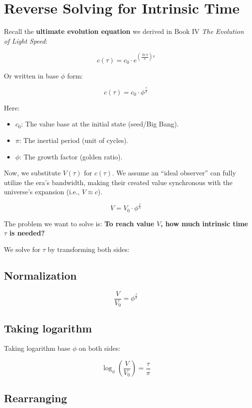 \section{Reverse Solving for Intrinsic Time}

Recall the \textbf{ultimate evolution equation} we derived in Book IV \textit{The Evolution of Light Speed}:

\[c(\tau) = c_0 \cdot e^{\left( \frac{\ln \phi}{\pi} \right) \tau}\]

Or written in base $\phi$ form:

\[c(\tau) = c_0 \cdot \phi^{\frac{\tau}{\pi}}\]

Here:

\begin{itemize}
\item \textbf{$c_0$}: The value base at the initial state (seed/Big Bang).

\item \textbf{$\pi$}: The inertial period (unit of cycles).

\item \textbf{$\phi$}: The growth factor (golden ratio).
\end{itemize}

Now, we substitute $V(\tau)$ for $c(\tau)$. We assume an ``ideal observer'' can fully utilize the era's bandwidth, making their created value synchronous with the universe's expansion (i.e., $V \approx c$).

\[V = V_0 \cdot \phi^{\frac{\tau}{\pi}}\]

The problem we want to solve is: \textbf{To reach value $V$, how much intrinsic time $\tau$ is needed?}

We solve for $\tau$ by transforming both sides:

\subsection{Normalization}

\[\frac{V}{V_0} = \phi^{\frac{\tau}{\pi}}\]

\subsection{Taking logarithm}

Taking logarithm base $\phi$ on both sides:

\[\log_{\phi} \left( \frac{V}{V_0} \right) = \frac{\tau}{\pi}\]

\subsection{Rearranging}

